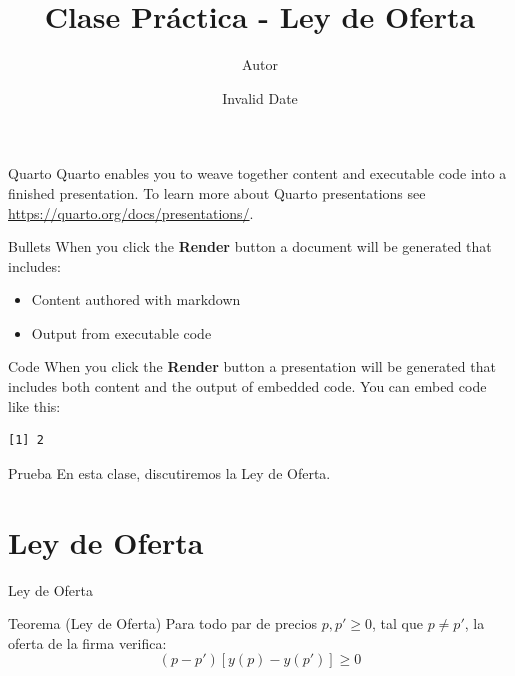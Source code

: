 \documentclass[
  ignorenonframetext,
]{beamer}
\title{Clase Práctica - Ley de Oferta}
\author{Autor}
\date{Invalid Date}
\providecommand{\tightlist}{%
  \setlength{\itemsep}{0pt}\setlength{\parskip}{0pt}}\usepackage{longtable,booktabs,array}
\begin{document}
\frame{\titlepage}


\begin{frame}{Quarto}
\label{quarto}
Quarto enables you to weave together content and executable code into a
finished presentation. To learn more about Quarto presentations see
\url{https://quarto.org/docs/presentations/}.
\end{frame}

\begin{frame}{Bullets}
\label{bullets}
When you click the \textbf{Render} button a document will be generated
that includes:

\begin{itemize}
\tightlist
\item
  Content authored with markdown
\item
  Output from executable code
\end{itemize}
\end{frame}

\begin{frame}[fragile]{Code}
\label{code}
When you click the \textbf{Render} button a presentation will be
generated that includes both content and the output of embedded code.
You can embed code like this:

\begin{verbatim}
[1] 2
\end{verbatim}
\end{frame}

\begin{frame}{Prueba}
\label{prueba}
En esta clase, discutiremos la Ley de Oferta.
\end{frame}

\section{Ley de Oferta}\label{ley-de-oferta}

\begin{frame}{Ley de Oferta}
\begin{block}{Teorema (Ley de Oferta)}
Para todo par de precios \( p, p' \geq 0 \), tal que \( p \neq p' \), la oferta de la firma verifica:
\[
(p - p') [ y(p) - y(p')] \geq 0
\]
\end{block}
\end{frame}
\end{document}
